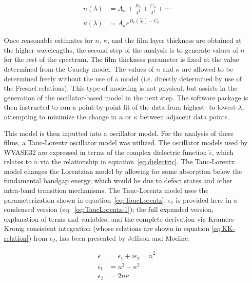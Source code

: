 \begin{subequations}
\label{eq:cauchy}
\begin{align}
	n\left(\lambda\right) &= A_{n} + \frac{B_{n}}{\lambda^{2}}+\frac{C_{n}}{\lambda^{4}}+\cdots\\
        	\kappa\left(\lambda\right) &= A_{\kappa}e^{B_{\kappa}\left(\frac{hc}{\lambda}\right)-C_{\kappa}}
\end{align}
\end{subequations}

Once reasonable estimates for $n$, $\kappa$, and the film layer thickness are obtained at the higher wavelengths, the second step of the analysis is to generate values of $\tilde{n}$ for the rest of the spectrum. The film thickness parameter is fixed at the value determined from the Cauchy model. The values of $n$ and $\kappa$ are allowed to be determined freely without the use of a model (i.e. directly determined by use of the Fresnel relations). This type of modeling is not physical, but assists in the generation of the oscillator-based model in the next step. The software package is then instructed to run a point-by-point fit of the data from highest- to lowest-$\lambda$, attempting to minimize the change in $n$ or $\kappa$ between adjacent data points. 

This model is then inputted into a oscillator model. For the analysis of these films, a Tauc-Lorentz oscillator model was utilized. The oscillator models used by WVASE32 are expressed in terms of the complex dielectric function $\tilde{\epsilon}$, which relates to $\tilde{n}$ via the relationship in equation~\vref{eq:dielectric}. The Tauc-Lorentz model changes the Lorentzian model by allowing for some absorption below the fundamental bandgap energy, which would be due to defect states and other intra-band transition mechanisms. The Tauc-Lorentz model uses the parameterization shown in equation~\vref{eq:TaucLorentz}\cite{WVASE-manual,Jellison96}. $\epsilon_{1}$ is provided here in a condensed version (eq.~\vref{eq:TaucLorentz-1}); the full expanded version, explanation of terms and variables, and the complete derivation via Kramers-Kronig consistent integration (whose relations are shown in equation \vref{eq:KK-relation})\cite{Jellison96,KRONIG:26,PhysRev.104.1760} from $\epsilon_{2}$, has been presented by Jellison and Modine.\cite{Jellison96} 

\begin{subequations}
\label{eq:dielectric}
\begin{align}
	\tilde{\epsilon} &= \epsilon_{1}+i\epsilon_{2} = \tilde{n}^{2}\\
	\epsilon_{1} &= n^{2} - \kappa^{2}\\
	\epsilon_{2} &= 2n\kappa 
\end{align}
\end{subequations}

